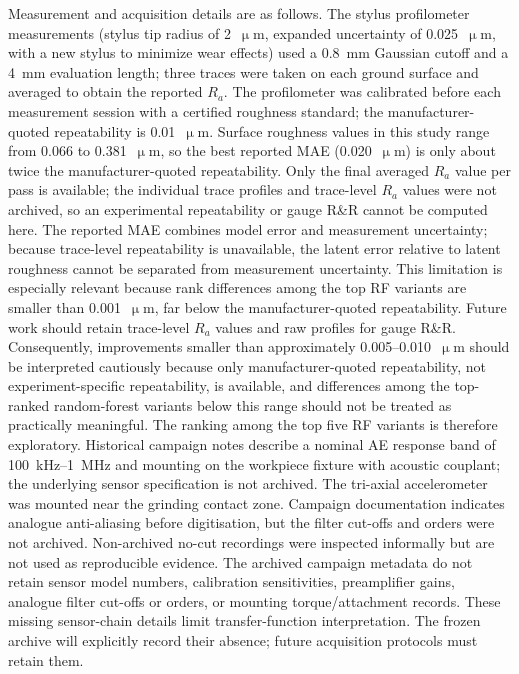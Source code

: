 Measurement and acquisition details are as follows. The stylus
profilometer measurements (stylus tip radius of 2~\(\upmu\)m, expanded uncertainty of 0.025~\(\upmu\)m, with a new stylus to minimize wear effects) used a 0.8~mm Gaussian cutoff and a 4~mm
evaluation length; three traces were taken on each ground surface and
averaged to obtain the reported $R_a$. The profilometer was calibrated
before each measurement session with a certified roughness standard; the
manufacturer-quoted repeatability is 0.01~\(\upmu\)m. Surface roughness values
in this study range from 0.066 to 0.381~\(\upmu\)m, so the best reported MAE
(0.020~\(\upmu\)m) is only about twice the manufacturer-quoted repeatability.
Only the final averaged $R_a$ value per pass is available; the
individual trace profiles and trace-level $R_a$ values were not archived,
so an experimental repeatability or gauge R\&R cannot be computed here.
The reported MAE combines model error and measurement uncertainty;
because trace-level repeatability is unavailable, the latent error
relative to latent roughness cannot be separated from
measurement uncertainty. This limitation is especially relevant because rank
differences among the top RF variants are smaller than 0.001~\(\upmu\)m,
far below the manufacturer-quoted repeatability. Future work should
retain trace-level $R_a$ values and raw profiles for gauge R\&R.
Consequently, improvements smaller than approximately 0.005--0.010~\(\upmu\)m
should be interpreted cautiously because only manufacturer-quoted
repeatability, not experiment-specific repeatability, is available, and
differences among the top-ranked random-forest variants below this range
should not be treated as practically meaningful. The
ranking among the top five RF variants is therefore exploratory.
Historical campaign notes describe a nominal AE response band of
100~kHz--1~MHz and mounting on the workpiece fixture with acoustic
couplant; the underlying sensor specification is not archived. The
tri-axial accelerometer was mounted near the grinding contact zone.
Campaign documentation indicates analogue anti-aliasing before digitisation,
but the filter cut-offs and orders were not archived. Non-archived no-cut recordings were inspected informally but
are not used as reproducible evidence.
The archived campaign metadata do not retain sensor model numbers,
calibration sensitivities, preamplifier gains, analogue filter cut-offs or
orders, or mounting torque/attachment records. These missing sensor-chain
details limit transfer-function interpretation. The frozen archive will
explicitly record their absence; future acquisition protocols must retain
them.

